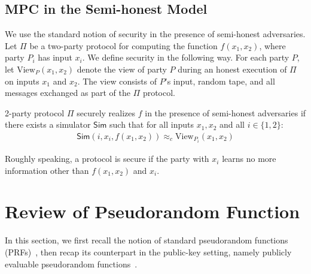 \documentclass[a4paper,10pt]{article}
\begin{document}
\subsection{MPC in the Semi-honest Model}
We use the standard notion of security in the presence of semi-honest adversaries. 
Let $\Pi$ be a two-party protocol for computing the function $f(x_1, x_2)$, where party $P_i$ has input $x_i$. 
We define security in the following way.
For each party $P$, let $\text{View}_P(x_1, x_2)$ denote the view of party $P$ 
during an honest execution of $\Pi$ on inputs $x_1$ and $x_2$. 
The view consists of $P$'s input, random tape, and all messages exchanged as part of the $\Pi$ protocol. 

\begin{definition}
2-party protocol $\Pi$ securely realizes $f$ in the presence of semi-honest adversaries if 
there exists a simulator $\mathsf{Sim}$ such that for all inputs $x_1, x_2$ and all $i \in \{1,2\}$:
\begin{gather*}
\mathsf{Sim}(i, x_i, f(x_1, x_2)) \approx_c \text{View}_{P_i}(x_1, x_2)
\end{gather*}
\end{definition}
Roughly speaking, a protocol is secure if the party with $x_i$ 
learns no more information other than $f(x_1, x_2)$ and $x_i$.  








\section{Review of Pseudorandom Function}
In this section, we first recall the notion of standard pseudorandom functions (PRFs)~\cite{GGM-JACM-1986}, 
then recap its counterpart in the public-key setting, 
namely publicly evaluable pseudorandom functions~\cite{CZ-SCN-2014}. 
\end{document}
